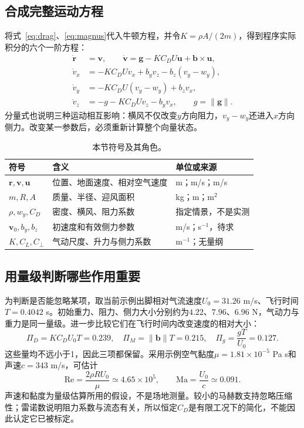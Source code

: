 \documentclass[11pt,a4paper,UTF8,fontset=windows]{ctexart}
\begin{document}
\subsection{合成完整运动方程}
将式~\eqref{eq:drag}、\eqref{eq:magnus}代入牛顿方程，并令$K=\rho A/(2m)$，得到程序实际积分的六个一阶方程：
\begin{align}
\dot{\mathbf r}&=\mathbf v,\qquad
\dot{\mathbf v}=\mathbf g-KC_DU\mathbf u+\mathbf b\times\mathbf u,\label{eq:model}\\
\dot v_x&=-KC_DUv_x+b_yv_z-b_z(v_y-w_y),\nonumber\\
\dot v_y&=-KC_DU(v_y-w_y)+b_zv_x,\nonumber\\
\dot v_z&=-g-KC_DUv_z-b_yv_x,\qquad g=\|\mathbf g\|.\nonumber
\end{align}
分量式也说明三种运动相互影响：横风不仅改变$y$方向阻力，$v_y-w_y$还进入$x$方向侧力。改变某一参数后，必须重新计算整个向量状态。
\begin{table}[H]\centering\small
\caption{本节符号及其角色。}\begin{tabular}{lll}\toprule
符号 & 含义 & 单位或来源\\\midrule
$\mathbf r,\mathbf v,\mathbf u$ & 位置、地面速度、相对空气速度 & m；m/s；m/s\\
$m,R,A$ & 质量、半径、迎风面积 & kg；m；m$^2$\\
$\rho,w_y,C_D$ & 密度、横风、阻力系数 & 指定情景，不是实测\\
$\mathbf v_0,b_y,b_z$ & 初速度和有效侧力参数 & m/s；s$^{-1}$，待求\\
$K,C_L,C_\perp$ & 气动尺度、升力与侧力系数 & m$^{-1}$；无量纲\\
\bottomrule\end{tabular}\end{table}
\subsection{用量级判断哪些作用重要}
为判断是否能忽略某项，取当前示例出脚相对气流速度$U_0=31.26$ m/s、飞行时间$T=0.4042$ s。初始重力、阻力、侧力大小分别约为$4.22$、$7.96$、$6.96$ N，气动力与重力是同一量级。进一步比较它们在飞行时间内改变速度的相对大小：
\begin{equation}
\Pi_D=KC_DU_0T=0.239,\quad
\Pi_M=\|\mathbf b\|T=0.215,\quad
\Pi_g=\frac{gT}{U_0}=0.127.
\end{equation}
这些量均不远小于1，因此三项都保留。采用示例空气黏度$\mu=1.81\times10^{-5}$ Pa s和声速$c=343$ m/s，可估计
\begin{equation}
\mathrm{Re}=\frac{2\rho RU_0}{\mu}\simeq4.65\times 10^{5},\qquad
\mathrm{Ma}=\frac{U_0}{c}\simeq0.091.
\end{equation}
声速和黏度为量级估算所用的假设，不是场地测量。较小的马赫数支持忽略压缩性；雷诺数说明阻力系数与流态有关，所以恒定$C_D$是有限工况下的简化，不能因此认定它已被标定。
\end{document}
